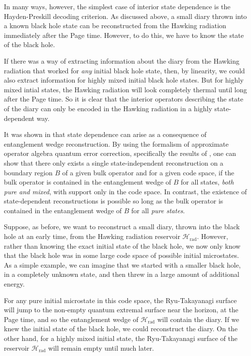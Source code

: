 \documentclass[11pt,a4paper]{article}
\begin{document}
In many ways, however, the simplest case of interior state dependence is the Hayden-Preskill decoding criterion. As discussed above, a small diary thrown into a known black hole state can be reconstructed from the Hawking radiation immediately after the Page time. However, to do this, we have to know the state of the black hole. 

If there was a way of extracting information about the diary from the Hawking radiation that worked for \emph{any} initial black hole state, then, by linearity, we could also extract information for highly mixed initial black hole states. But for highly mixed intial states, the Hawking radiation will look completely thermal until long after the Page time. So it is clear that the interior operators describing the state of the diary can only be encoded in the Hawking radiation in a highly state-dependent way.

It was shown in \cite{hayden2018learning} that state dependence can arise as a consequence of entanglement wedge reconstruction. By using the formalism of approximate operator algebra quantum error correction, specifically the results of \cite{beny2007generalization, beny2009conditions, beny2010general}, one can show that there only exists a single state-independent reconstruction on a boundary region $B$ of a given bulk operator and for a given code space, if the bulk operator is contained in the entanglement wedge of $B$ for all states, \emph{both pure and mixed}, with support only in the code space. In contrast, the existence of state-dependent reconstructions is possible so long as the bulk operator is contained in the entanglement wedge of $B$ for all \emph{pure states}.

Suppose, as before, we want to reconstruct a small diary, thrown into the black hole at an early time, from the Hawking radiation reservoir $\mathcal{H}_\text{rad}$. However, rather than knowing the exact initial state of the black hole, we now only know that the black hole was in some large code space of possible initial microstates. As a simple example, we can imagine that we started with a smaller black hole, in a completely unknown state, and then threw in a large amount of additional energy.

For any pure initial microstate in this code space, the Ryu-Takayanagi surface will jump to the non-empty quantum extremal surface near the horizon, at the Page time, and so the entanglement wedge of $\mathcal{H}_\text{rad}$ will contain the diary. If we knew the initial state of the black hole, we could reconstruct the diary. On the other hand, for a highly mixed initial state, the Ryu-Takayanagi surface of the reservoir $\mathcal{H}_\text{rad}$ will remain empty until much later. 
\end{document}
